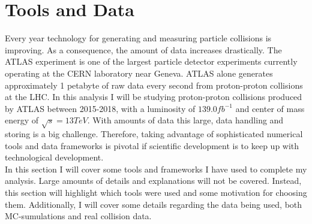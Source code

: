\section{Tools and Data}
Every year technology for generating and measuring particle collisions is improving. 
As a consequence, the amount of data increases drastically. The \ac{ATLAS} experiment
is one of the largest particle detector experiments currently operating at the 
CERN laboratory near Geneva. \ac{ATLAS} alone generates approximately 1 petabyte of raw
data every second from proton-proton collisions at the \ac{LHC}. In this analysis I will 
be studying proton-proton collisions produced by \ac{ATLAS} between 2015-2018, with a luminosity of 
$139.0fb^{-1}$ and center of mass energy of $\sqrt{s} = 13TeV$. With amounts of data this large, data handling and 
storing is a big challenge. Therefore, taking advantage of sophisticated numerical tools 
and data frameworks is pivotal if scientific development is to keep up with technological development.
\\
In this section I will cover some tools and frameworks I have used to 
complete my analysis. Large amounts of details and explanations will not be covered. 
Instead, this section will highlight which tools were used and some motivation
for choosing them. Additionally, I will cover some details regarding the data
being used, both \ac{MC}-sumulations and real collision data.
